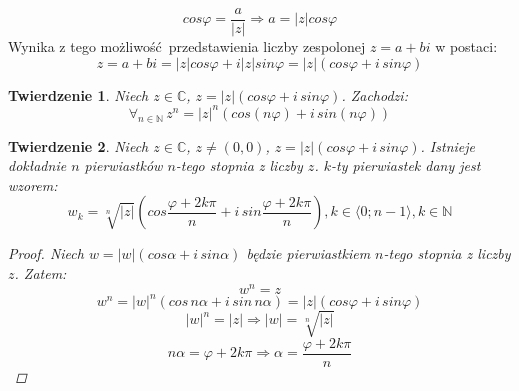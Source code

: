 \documentclass{article}
\newtheorem{theorem}{Twierdzenie}[section]
\begin{document}
    \begin{equation*}
        cos \varphi = \frac{a}{\mathopen|z\mathclose|} \Longrightarrow a = \mathopen|z\mathclose| cos \varphi
    \end{equation*}
    Wynika z tego możliwość przedstawienia liczby zespolonej $z = a + bi$ w postaci:
    \begin{equation*}
        z = a + bi = \mathopen|z\mathclose| cos \varphi + i \mathopen|z\mathclose| sin \varphi = \mathopen|z\mathclose|(cos \varphi + i\, sin \varphi)
    \end{equation*}
    \begin{theorem}
        Niech $z \in \mathds{C}$, $z = \mathopen|z\mathclose|(cos \varphi + i\, sin \varphi)$. Zachodzi:
        \begin{equation*}
            \forall_{n \in \mathds{N}} \, z^n = {\mathopen|z\mathclose|}^n (cos(n\varphi) + i\, sin(n\varphi))
        \end{equation*}
    \end{theorem}
    \begin{theorem}
        Niech $z \in \mathds{C}$, $z \neq (0,0)$, $z = \mathopen|z\mathclose|(cos\varphi + i\, sin\varphi)$.
        Istnieje dokładnie $n$ pierwiastków $n$-tego stopnia z liczby $z$. $k$-ty pierwiastek dany jest wzorem:
        \begin{equation*}
            w_k = \sqrt[n]{\mathopen|z\mathclose|}\left(cos\frac{\varphi+2k\pi}{n} + i\, sin \frac{\varphi+2k\pi}{n}\right), k \in \langle0; n-1 \rangle, k \in \mathds{N}
        \end{equation*}
        \begin{proof}
            Niech $w = \mathopen|w\mathclose|(cos \alpha + i\, sin \alpha)$ będzie pierwiastkiem $n$-tego stopnia z liczby $z$. Zatem:
            \begin{equation*}
                w^n = z
            \end{equation*}
            \begin{equation*}
                w^n = {\mathopen|w\mathclose|}^n(cos\, n\alpha + i\, sin\, n\alpha) = \mathopen|z\mathclose|(cos\varphi + i\, sin\varphi)
            \end{equation*}
            \begin{equation*}
                {\mathopen|w\mathclose|}^n = \mathopen|z\mathclose| \Longrightarrow \mathopen|w\mathclose| = \sqrt[n]{\mathopen|z\mathclose|}
            \end{equation*}
            \begin{equation*}
                n\alpha = \varphi+2k\pi \Longrightarrow \alpha = \frac{\varphi+2k\pi}{n}
            \end{equation*}
        \end{proof}
    \end{theorem}
\end{document}
